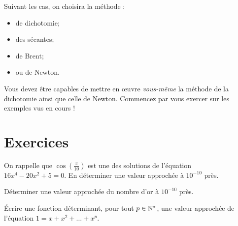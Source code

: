 Suivant les cas, on choisira la méthode :
\begin{itemize}
\item de dichotomie;
\item des sécantes;
\item de Brent;
\item ou de Newton.
\end{itemize}

Vous devez être capables de mettre en {\oe}uvre \emph{vous-même} la méthode de la dichotomie ainsi que celle de Newton. 
Commencez par vous exercer sur les exemples vus en cours ! 

\section{Exercices}

  On rappelle que $\cos\left(\frac{\pi}{10}\right)$ est une des solutions de l'équation $16x^4-20x^2+5 = 0$. En déterminer une valeur approchée à $10^{-10}$ près.

  Déterminer une valeur approchée du nombre d'or à $10^{-10}$ près.

  Écrire une fonction déterminant, pour tout $p \in \mathbb{N}^\ast$, une valeur approchée de l'équation $1 = x + x^2 + \dots + x^p$. 



